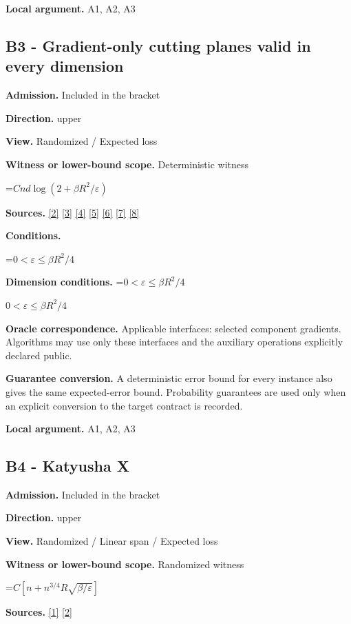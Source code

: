 \documentclass[10pt,a4paper]{article}
\newcommand{\AtlasMath}[1]{\par\begingroup\centering\setbox0=\hbox{$\displaystyle #1$}\ifdim\wd0>1.4\linewidth\typeout{ATLAS WIDE FORMULA: \the\wd0}\fi\ifdim\wd0>\linewidth\resizebox{\linewidth}{!}{\box0}\else\box0\fi\par\endgroup}
\newcommand{\AtlasInlineMath}[1]{\begingroup\setbox0=\hbox{$#1$}\ifdim\wd0>.4\linewidth\endgroup\AtlasMath{#1}\else\endgroup$#1$\fi}
\begin{document}
\textbf{Local argument.} A1, A2, A3

\subsection{B3 - Gradient-only cutting planes valid in every dimension}
\textbf{Admission.} Included in the bracket

\textbf{Direction.} upper

\textbf{View.} Randomized / Expected loss

\textbf{Witness or lower-bound scope.} Deterministic witness

\AtlasMath{Cnd\log(2+\beta R^2/\varepsilon)}
\textbf{Sources.} \href{https://proceedings.mlr.press/v97/zhou19b/zhou19b.pdf}{[2]} \href{https://arxiv.org/pdf/1405.4980}{[3]} \href{https://arxiv.org/pdf/2101.09740v2}{[4]} \href{https://arxiv.org/pdf/2609.33360v2}{[5]} \href{https://arxiv.org/pdf/2609.10874}{[6]} \href{https://www2.isye.gatech.edu/~nemirovs/MOR_AccuracyCertificates.pdf}{[7]} \href{https://arxiv.org/pdf/2609.20701}{[8]}

\textbf{Conditions.} 
\AtlasMath{0<\varepsilon\le\beta R^2/4}


\textbf{Dimension conditions.} \AtlasInlineMath{0<\varepsilon\le\beta R^2/4}

\textbf{Oracle correspondence.} Applicable interfaces: selected component gradients. Algorithms may use only these interfaces and the auxiliary operations explicitly declared public.

\textbf{Guarantee conversion.} A deterministic error bound for every instance also gives the same expected-error bound. Probability guarantees are used only when an explicit conversion to the target contract is recorded.

\textbf{Local argument.} A1, A2, A3

\subsection{B4 - Katyusha X}
\textbf{Admission.} Included in the bracket

\textbf{Direction.} upper

\textbf{View.} Randomized / Linear span / Expected loss

\textbf{Witness or lower-bound scope.} Randomized witness

\AtlasMath{C[n+n^{3/4}R\sqrt{\beta/\varepsilon}]}
\textbf{Sources.} \href{https://arxiv.org/pdf/1802.03866}{[1]} \href{https://proceedings.mlr.press/v97/zhou19b/zhou19b.pdf}{[2]}
\end{document}
